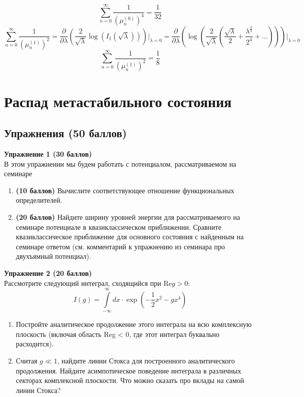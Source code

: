 \documentclass[12pt]{article}
\theoremstyle{definition}
\begin{document}
\begin{enumerate}
\begin{equation}
    \end{equation}
    \begin{equation}
        \boxed{\sum_{n=0}^{\infty}\frac{1}{\left(\mu_{n}^{(0)}\right)^4}=\frac{1}{32}}
    \end{equation}
    \begin{equation*}
        \sum_{n=0}^{\infty}\frac{1}{\left(\mu_{n}^{(1)}\right)^{2}}=\frac{\partial}{\partial\lambda}\left(\frac{2}{\sqrt{\lambda}}\log\left(I_1(\sqrt{\lambda})\right)\right)\bigg|_{\lambda=0}=\frac{\partial}{\partial\lambda}\left(\log\left(\frac{2}{\sqrt{\lambda}}\left(\frac{\sqrt{\lambda}}{2}+\frac{\lambda^\frac{3}{2}}{2^{4}}+...\right)\right)\right)\bigg|_{\lambda=0}
    \end{equation*}
    \begin{equation}
        \boxed{\sum_{n=0}^{\infty}\frac{1}{\left(\mu_{n}^{(1)}\right)^2}=\frac{1}{8}}
    \end{equation}
\end{enumerate}
\section{Распад метастабильного состояния}
\subsection*{Упражнения (50 баллов)}
\textbf{Упражнение 1 (30 баллов)}\\
В этом упражнении мы будем работать с потенциалом, рассматриваемом на семинаре
\begin{enumerate}
    \item \textbf{(10 баллов)} Вычислите соответствующее отношение функциональных определителей.
    \item \textbf{(20 баллов)} Найдите ширину уровней энергии для рассматриваемого на семинаре потенциале в квазиклассическом приближении. Сравните квазиклассическое приближение для основного состояния с найденным на семинаре ответом (см. комментарий к упражнению из семинара про двухъямный потенциал).
\end{enumerate}
\textbf{Упражнение 2 (20 баллов)}\\
Рассмотрите следующий интеграл, сходящийся при $\text{Re}g > 0$:
\begin{equation}
    I(g) =\int\limits_{-\infty}^\infty dx\cdot\exp\left(-\frac{1}{2}x^2-gx^4\right)
\end{equation}
\begin{enumerate}
    \item Постройте аналитическое продолжение этого интеграла на всю комплексную плоскость (включая область Reg < 0, где этот интеграл буквально расходится).
    \item Считая $g \ll 1$, найдите линии Стокса для построенного аналитического продолжения. Найдите асимпотическое поведение интеграла в различных секторах комплексной плоскости. Что можно сказать про вклады на самой линии Стокса?
\end{enumerate}
\end{document}
